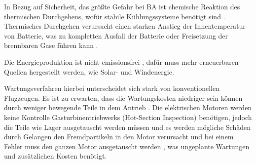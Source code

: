 In Bezug auf Sicherheit, das größte Gefahr bei BA ist chemische Reaktion des thermischen Durchgehens, wofür stabile
Kühlungssysteme benötigt sind \cite{donckers2024electric}. Thermisches Durchgehen verursacht einen starken Anstieg der 
Innentemperatur von Batterie, was zu kompletten Ausfall der Batterie oder Freisetzung der brennbaren Gase führen kann \cite{shahid2022review}.


Die Energieproduktion ist nicht emissionsfrei \cite{abrantes2024impact}, dafür muss mehr erneuerbaren Quellen hergestellt werden, 
wie Solar- und Windenergie. 



Wartungsverfahren hierbei unterscheidet sich stark von konventionellen Flugzeugen. 
Es ist zu erwarten, dass die Wartungskosten niedriger sein können durch weniger bewegende Teile in dem Antrieb \cite{dalmia2022powering}. 
%
Die elektrischen Motoren werden keine Kontrolle Gasturbinentriebwerks (Hot-Section Inspection) benötigen, 
jedoch die Teile wie Lager ausgetauscht werden müssen und 
es werden mögliche Schäden durch Gelangen den Fremdpartikeln in den Motor verursacht \cite{reimers2018introduction} 
und bei einem Fehler muss den ganzen Motor ausgetauscht werden \cite{dalmia2022powering}, was ungeplante
Wartungen und zusätzlichen Kosten benötigt.